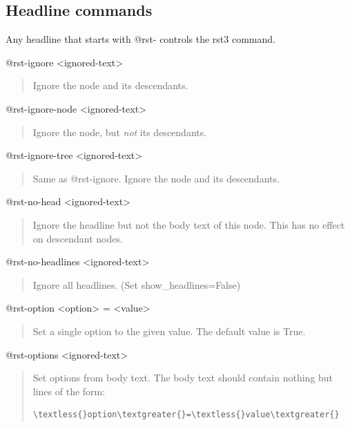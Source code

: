 \documentclass[a4paper,10pt,english]{sphinxmanual}
\begin{document}
\subsection{Headline commands}
\label{rstplugin3:headline-commands}
Any headline that starts with @rst- controls the rst3 command.
\begin{description}
\end{description}

@rst-ignore \textless{}ignored-text\textgreater{}
\begin{quote}

Ignore the node and its descendants.
\end{quote}

@rst-ignore-node \textless{}ignored-text\textgreater{}
\begin{quote}

Ignore the node, but \emph{not} its descendants.
\end{quote}

@rst-ignore-tree \textless{}ignored-text\textgreater{}
\begin{quote}

Same as @rst-ignore.  Ignore the node and its descendants.
\end{quote}

@rst-no-head \textless{}ignored-text\textgreater{}
\begin{quote}

Ignore the headline but not the body text of this node.
This has no effect on descendant nodes.
\end{quote}

@rst-no-headlines \textless{}ignored-text\textgreater{}
\begin{quote}

Ignore all headlines. (Set show\_headlines=False)
\end{quote}

@rst-option \textless{}option\textgreater{} = \textless{}value\textgreater{}
\begin{quote}

Set a single option to the given value. The default value is True.
\end{quote}

@rst-options \textless{}ignored-text\textgreater{}
\begin{quote}

Set options from body text. The body text should contain nothing but
lines of the form:

\begin{Verbatim}[commandchars=\\\{\}]
\textless{}option\textgreater{}=\textless{}value\textgreater{}
\end{Verbatim}
\end{quote}
\end{document}
